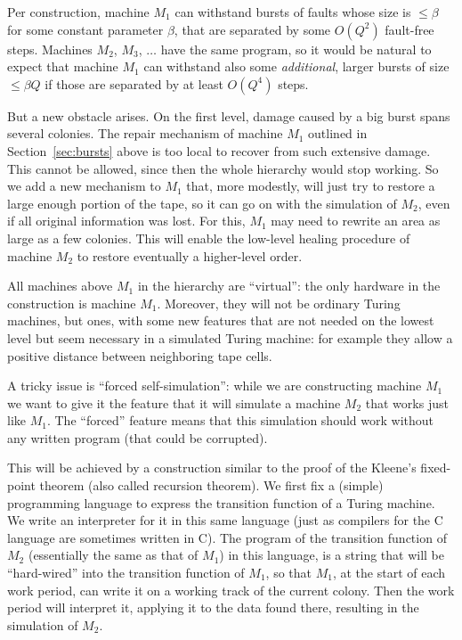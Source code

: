\documentclass[11pt]{memoir}
\theoremstyle{definition} %
\renewcommand{\le}{\leq}
\newcommand{\Q}{Q}
\begin{document}
Per construction, machine \( M_{1} \) can withstand
bursts of faults whose size is \( \le \beta \) for some constant parameter \( \beta \), that
are separated by some \( O(\Q^{2}) \) fault-free steps.
Machines \( M_{2} \), \( M_3 \), \( \dots \) have the same program, so it
would be natural to expect that machine
\( M_{1} \) can withstand also some \emph{additional}, larger bursts
of size \( \le \beta \Q \) if those are separated by at least \( O(\Q^{4}) \) steps.

But a new obstacle arises.
On the first level, damage caused by a big burst spans several colonies.
The repair mechanism of machine \( M_{1} \) outlined in Section~\ref{sec:bursts} above 
is too local to recover from such extensive damage.
This cannot be allowed, since then the whole hierarchy would stop working.
So we add a new mechanism to \( M_{1} \) that, more modestly,
will just try to restore a large enough portion of the
tape, so it can go on with the simulation of \( M_{2} \), even if all 
original information was lost.
For this, \( M_{1} \) may need to rewrite an area as large as a few colonies.
This will enable the low-level healing procedure of 
machine \( M_{2} \) to restore eventually a higher-level order.

All machines above \( M_{1} \) in the hierarchy are
``virtual'': the only hardware in the construction is machine \( M_{1} \).
Moreover, they will not be ordinary Turing machines, but  ones,
with some new features that are not needed on the lowest level but seem necessary
in a simulated Turing machine: for example they
allow a positive distance between neighboring tape cells.

A tricky issue is ``forced self-simulation'': while we are constructing machine \( M_{1} \)
we want to give it the feature that it will simulate a machine \( M_{2} \) that
works just like \( M_{1} \).
The ``forced'' feature means that this simulation should
work without any written program (that could be corrupted).

This will be achieved by
a construction similar to the proof of the Kleene's fixed-point 
theorem (also called recursion theorem).
We first fix a (simple) programming language to express the transition
function of a Turing machine.
We write an interpreter for it in this same language (just as compilers for the 
C language are sometimes written in C).
The program of the transition function of \( M_{2} \)
(essentially the same as that of \( M_{1} \))
in this language, is a string that will be
``hard-wired'' into the transition function of \( M_{1} \), 
so that \( M_{1} \), at the start of each work period, can write
it on a working track of the current colony.
Then the work period will interpret it, 
applying it to the data found there, resulting
in the simulation of \( M_{2} \).
\end{document}
